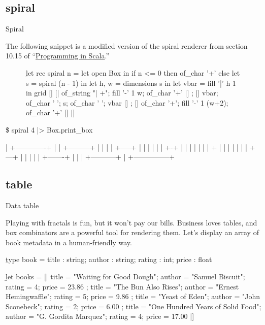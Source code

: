 \documentclass{article}
\begin{document}
\subsection{spiral}{Spiral}

The following snippet is a modified version of the spiral renderer from section 10.15 of ``\href{https://www.goodreads.com/book/show/5680904-programming-in-scala}{Programming in Scala}.''

\begin{figure}
\begin{code}[ocaml]
\b{let rec} spiral n =
    let open Box in
    if n <= 0
    then of_char '+'
    else let s = spiral (n - 1) in
         let h, w = dimensions s in
         let vbar = fill '|' h 1 in
         grid [| [| of_string "| +"; fill '-' 1 w; of_char '+' |]
               ; [| vbar; of_char ' '; s; of_char ' '; vbar |]
               ; [| of_char '+'; fill '-' 1 (w+2); of_char '+' |] |]
\end{code}
\end{figure}

\begin{code}[text]
\$ spiral 4 |> Box.print_box

| +-------------+
| | +---------+ |
| | | +-----+ | |
| | | | +-+ | | |
| | | | + | | | |
| | | +---+ | | |
| | +-------+ | |
| +-----------+ |
+---------------+
\end{code}

\subsection{table}{Data table}

Playing with fractals is fun, but it won't pay our bills.
Business loves tables, and box combinators are a powerful tool for rendering them.
Let's display an array of book metadata in a human-friendly way.

\begin{code}[ocaml]
\b{type} book = { title : string;
              author : string;
              rating : int;
              price : float }

\b{let} books = [| { title = "Waiting for Good Dough";
                 author = "Samuel Biscuit";
                 rating = 4;
                 price = 23.86 };
               { title = "The Bun Also Rises";
                 author = "Ernest Hemingwaffle";
                 rating = 5;
                 price = 9.86 };
               { title = "Yeast of Eden";
                 author = "John Sconebeck";
                 rating = 2;
                 price = 6.00 };
               { title = "One Hundred Years of Solid Food";
                 author = "G. Gordita Marquez";
                 rating = 4;
                 price = 17.00 }
             |]
\end{code}
\end{document}
